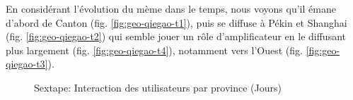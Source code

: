 En consid\'erant l{\textquoteright}\'evolution du m\`eme dans le temps,
nous voyons qu{\textquoteright}il \'emane d{\textquoteright}abord de
Canton (fig. \ref{fig:geo-qiegao-t1}), puis se diffuse \`a P\'ekin et Shanghai (fig. \ref{fig:geo-qiegao-t2}) qui semble jouer un r\^ole d{\textquoteright}amplificateur en le diffusant plus largement (fig. \ref{fig:geo-qiegao-t4}), notamment vers l{\textquoteright}Ouest (fig. \ref{fig:geo-qiegao-t3}). 


\begin{figure}[H]
    \centering
    
  \caption{
    Sextape: Interaction des utilisateurs par province (Jours)
  }
\end{figure}


